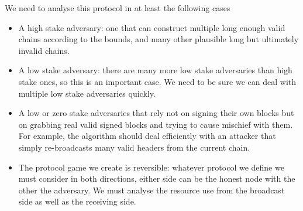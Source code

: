 \documentclass{article}
\theoremstyle{definition}{
  \newtheorem{lemma}{Lemma}[section] %
  \newtheorem{definition}[lemma]{Definition}
}
\theoremstyle{theorem}{
  \newtheorem{invariant}[lemma]{Invariant}
  \newtheorem{proofobligation}[lemma]{Proof Obligation}
}
\numberwithin{equation}{lemma}
\begin{document}
We need to analyse this protocol in at least the following cases
\begin{itemize}
\item A high stake adversary: one that can construct multiple long enough valid
chains according to the bounds, and many other plausible long but ultimately
invalid chains.
\item A low stake adversary: there are many more low stake adversaries than
high stake ones, so this is an important case. We need to be sure we can deal
with multiple low stake adversaries quickly.
\item A low or zero stake adversaries that rely not on signing their own blocks
but on grabbing real valid signed blocks and trying to cause mischief with
them. For example, the algorithm should deal efficiently with an attacker that
simply re-broadcasts many valid headers from the current chain.
\item The protocol game we create is reversible: whatever protocol we define
we must consider in both directions, either side can be the honest node with
the other the adversary. We must analyse the resource use from the broadcast
side as well as the receiving side.
\end{itemize}
\end{document}
